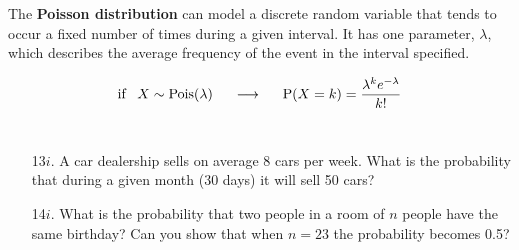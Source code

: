 \documentclass[10pt]{extarticle}
\renewcommand{\P}{\text{P}}
\begin{document}
\hfill

The {\bf Poisson distribution} can model a discrete random variable that tends to occur a fixed number of times during a given interval. It has one parameter, $\lambda$, which describes the average frequency of the event in the interval specified. 

$$\text{if} \;\;\; X \sim \text{Pois}(\lambda) \hspace{0.5cm} \longrightarrow \hspace{0.5cm} \P(X = k) = \frac{\lambda^k e^{-\lambda}}{k!}$$ \ 

\begin{itemize}

	\item[13$i$.] A car dealership sells on average 8 cars per week. What is the probability that during a given month (30 days) it will sell 50 cars? \\  

	\item[14$i$.] What is the probability that two people in a room of $n$ people have the same birthday? Can you show that when $n = 23$ the probability becomes 0.5? \\ 

\end{itemize}
\end{document}
